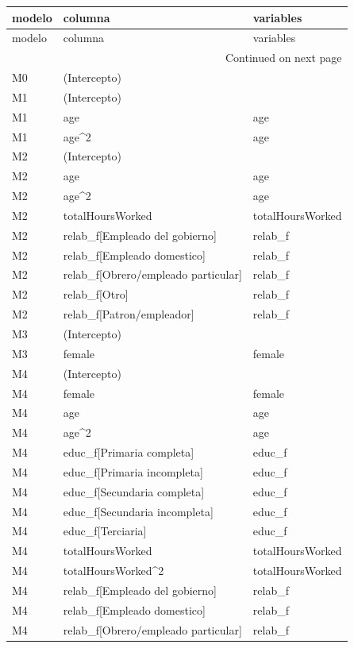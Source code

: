 \begin{longtable}{lll}
\toprule
modelo & columna & variables \\
\midrule
\endfirsthead
\toprule
modelo & columna & variables \\
\midrule
\endhead
\midrule
\multicolumn{3}{r}{Continued on next page} \\
\midrule
\endfoot
\bottomrule
\endlastfoot
M0 & (Intercepto) &  \\
M1 & (Intercepto) &  \\
M1 & age & age \\
M1 & age\textasciicircum 2 & age \\
M2 & (Intercepto) &  \\
M2 & age & age \\
M2 & age\textasciicircum 2 & age \\
M2 & totalHoursWorked & totalHoursWorked \\
M2 & relab\_f[Empleado del gobierno] & relab\_f \\
M2 & relab\_f[Empleado domestico] & relab\_f \\
M2 & relab\_f[Obrero/empleado particular] & relab\_f \\
M2 & relab\_f[Otro] & relab\_f \\
M2 & relab\_f[Patron/empleador] & relab\_f \\
M3 & (Intercepto) &  \\
M3 & female & female \\
M4 & (Intercepto) &  \\
M4 & female & female \\
M4 & age & age \\
M4 & age\textasciicircum 2 & age \\
M4 & educ\_f[Primaria completa] & educ\_f \\
M4 & educ\_f[Primaria incompleta] & educ\_f \\
M4 & educ\_f[Secundaria completa] & educ\_f \\
M4 & educ\_f[Secundaria incompleta] & educ\_f \\
M4 & educ\_f[Terciaria] & educ\_f \\
M4 & totalHoursWorked & totalHoursWorked \\
M4 & totalHoursWorked\textasciicircum 2 & totalHoursWorked \\
M4 & relab\_f[Empleado del gobierno] & relab\_f \\
M4 & relab\_f[Empleado domestico] & relab\_f \\
M4 & relab\_f[Obrero/empleado particular] & relab\_f \\

\end{longtable}

